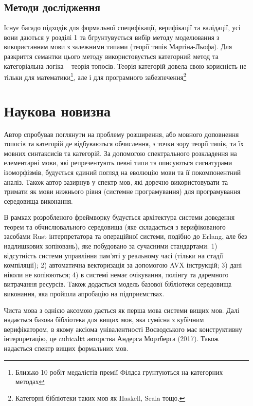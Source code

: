 \subsection{Методи дослідження}
Існує багадо підходів для формальної специфікації,
верифікації та валідації, усі вони даються у розділі 1 та
бгрунтувується вибір методу моделювання з використанням
мови з залежними типами (теорії типів Мартіна-Льофа).
Для разкриття семантки цього методу використовується
категорний метод та категоріальна логіка -- теорія топосів.
Теорія категорій довела свою корисність не тільки для
математики\footnote{Близько 10 робіт медалістів премії Філдса грунтуються на категорних методах},
але і для програмного забезпечення\footnote{Категорні бібліотеки таких мов як Haskell, Scala тощо.}


\section{Наукова новизна}
Автор спробував поглянути на проблему розширення, або мовного доповнення
топосів та категорій де відбуваються обчислення, з точки зору теорії типів,
та їх мовних синтаксисів та категорій. За допомогою спектрального розкладення на
елементарні мови, які репрезентують певні типи та описуються сигнатурами ізоморфізмів,
будується єдиний погляд на еволюцію мови та її покомпонентний аналіз. Також автор
зазирнув у спектр мов, які доречно використовувати та тримати як мови нижнього рівня (системне програмування)
для програмування середовища виконання.

В рамках розробленого фреймворку будується
архітектура системи доведення теорем та обчислювального
середовища (яке складається з верифікованого засобами Rust
інтерпретатора та операційної системи, подібно до Erlang, але без надлишкових копіювань),
яке побудовано за сучасними стандартами:
1) відсутність системи управління пам'яті у реальному часі (тільки на стадії компіляції);
2) автоматична векторизація за допомогою AVX інструкцій;
3) дані ніколи не копіюються;
4) в системі немає очікування, полінгу та даремного витрачання ресурсів.
Також додається модель базової бібліотеки середовища виконання,
яка пройшла апробацію на підприємствах.

Чиста мова з однією аксомою дається як перша мова системи вищих мов.
Далі надається базова бібліотека для вищих мов, яка сумісна з кубічним верифікатором,
в якому аксіома унівалентності Воєводського має конструктивну інтерпретацію,
це cubicaltt авторства Андерса Мортберга (2017). Також надається спектр вищих формальних мов.

